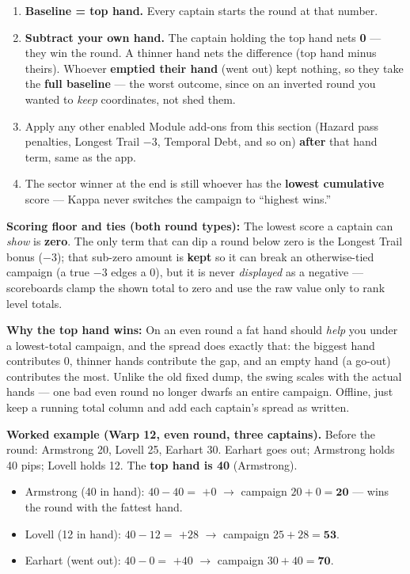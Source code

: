 \documentclass[11pt]{article}
\providecommand{\tightlist}{%
  \setlength{\itemsep}{0pt}\setlength{\parskip}{0pt}}
\begin{document}
\begin{enumerate}
\def\labelenumi{\arabic{enumi}.}
\tightlist
\item
  \textbf{Baseline = top hand.} Every captain starts the round at that
  number.
\item
  \textbf{Subtract your own hand.} The captain holding the top hand
  nets \textbf{0} --- they win the round. A thinner hand nets the
  difference (top hand minus theirs). Whoever \textbf{emptied their
  hand} (went out) kept nothing, so they take the \textbf{full baseline}
  --- the worst outcome, since on an inverted round you wanted to
  \emph{keep} coordinates, not shed them.
\item
  Apply any other enabled Module add-ons from this section (Hazard pass
  penalties, Longest Trail $-3$, Temporal Debt, and so on) \textbf{after}
  that hand term, same as the app.
\item
  The sector winner at the end is still whoever has the
  \textbf{lowest cumulative} score --- Kappa never switches the campaign
  to ``highest wins.''
\end{enumerate}

\textbf{Scoring floor and ties (both round types):} The lowest score a
captain can \emph{show} is \textbf{zero}. The only term that can dip a
round below zero is the Longest Trail bonus ($-3$); that sub-zero amount
is \textbf{kept} so it can break an otherwise-tied campaign (a true
$-3$ edges a $0$), but it is never \emph{displayed} as a negative ---
scoreboards clamp the shown total to zero and use the raw value only to
rank level totals.

\textbf{Why the top hand wins:} On an even round a fat hand should
\emph{help} you under a lowest-total campaign, and the spread does
exactly that: the biggest hand contributes 0, thinner hands contribute
the gap, and an empty hand (a go-out) contributes the most. Unlike the
old fixed dump, the swing scales with the actual hands --- one bad even
round no longer dwarfs an entire campaign. Offline, just keep a running
total column and add each captain's spread as written.

\textbf{Worked example (Warp 12, even round, three captains).} Before
the round: Armstrong 20, Lovell 25, Earhart 30. Earhart goes out;
Armstrong holds 40 pips; Lovell holds 12. The \textbf{top hand is 40}
(Armstrong).

\begin{itemize}
\tightlist
\item
  Armstrong (40 in hand): \(40-40=\) \textbf{$+0$} $\rightarrow$
  campaign \(20+0=\textbf{20}\) --- wins the round with the fattest
  hand.
\item
  Lovell (12 in hand): \(40-12=\) \textbf{$+28$} $\rightarrow$ campaign
  \(25+28=\textbf{53}\).
\item
  Earhart (went out): \(40-0=\) \textbf{$+40$} $\rightarrow$ campaign
  \(30+40=\textbf{70}\).
\end{itemize}
\end{document}
